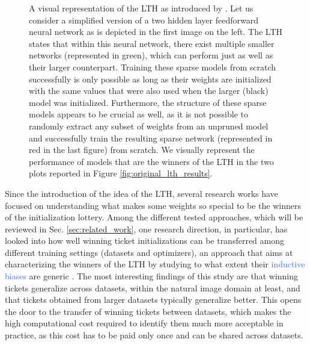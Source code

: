 \begin{figure}[!htb]
\endminipage
\caption{A visual representation of the LTH as introduced by \citet{frankle2018lottery}. Let us consider a simplified version of a two hidden layer feedforward neural network as is depicted in the first image on the left. The LTH states that within this neural network, there exist multiple smaller networks (represented in green), which can perform just as well as their larger counterpart. Training these sparse models from scratch successfully is only possible as long as their weights are initialized with the same values that were also used when the larger (black) model was initialized. Furthermore, the structure of these sparse models appears to be crucial as well, as it is not possible to randomly extract any subset of weights from an unpruned model and successfully train the resulting sparse network (represented in red in the last figure) from scratch. We visually represent the performance of models that are the winners of the LTH in the two plots reported in Figure \ref{fig:original_lth_results}.} 
\label{fig:tickets_visualization}
\end{figure}



Since the introduction of the idea of the LTH, several research works have focused on understanding what makes some weights so special to be the winners of the initialization lottery. Among the different tested approaches, which will be reviewed in Sec. \ref{sec:related_work}, one research direction, in particular, has looked into how well winning ticket initializations can be transferred among different training settings (datasets and optimizers), an approach that aims at characterizing the winners of the LTH by studying to what extent their \textcolor{RoyalBlue}{inductive biases} are generic \cite{morcos2019one}. The most interesting findings of this study are that winning tickets generalize across datasets, within the natural image domain at least, and that tickets obtained from larger datasets typically generalize better. This opens the door to the transfer of winning tickets between datasets, which makes the high computational cost required to identify them much more acceptable in practice, as this cost has to be paid only once and can be shared across datasets.

